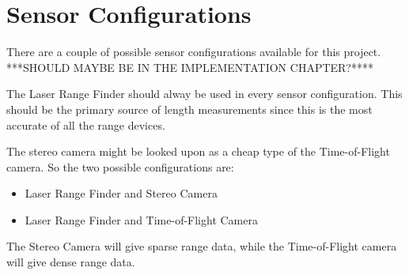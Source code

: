 \section{Sensor Configurations}
There are a couple of possible sensor configurations available for this project. ***SHOULD
MAYBE BE IN THE IMPLEMENTATION CHAPTER?****

The Laser Range Finder should alway be used in every sensor configuration. This should be
the primary source of length measurements since this is the most accurate of all the range
devices. 

The stereo camera might be looked upon as a cheap type of the Time-of-Flight camera. So
the two possible configurations are:
\begin{itemize}
    \item Laser Range Finder and Stereo Camera
    \item Laser Range Finder and Time-of-Flight Camera
\end{itemize}
The Stereo Camera will give sparse range data, while the Time-of-Flight camera will give
dense range data. 




